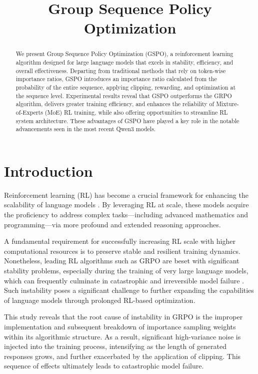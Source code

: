 \title{Group Sequence Policy Optimization}

\begin{abstract}
We present Group Sequence Policy Optimization (GSPO), a reinforcement learning algorithm designed for large language models that excels in stability, efficiency, and overall effectiveness. Departing from traditional methods that rely on token-wise importance ratios, GSPO introduces an importance ratio calculated from the probability of the entire sequence, applying clipping, rewarding, and optimization at the sequence level. Experimental results reveal that GSPO outperforms the GRPO algorithm, delivers greater training efficiency, and enhances the reliability of Mixture-of-Experts (MoE) RL training, while also offering opportunities to streamline RL system architecture. These advantages of GSPO have played a key role in the notable advancements seen in the most recent Qwen3 models.
\end{abstract}

\section{Introduction}
\label{sec:intro}

Reinforcement learning (RL) has become a crucial framework for enhancing the scalability of language models \citep{o1,dpsk-r1,qwq32b,qwen3}. By leveraging RL at scale, these models acquire the proficiency to address complex tasks—including advanced mathematics and programming—via more profound and extended reasoning approaches.

A fundamental requirement for successfully increasing RL scale with higher computational resources is to preserve stable and resilient training dynamics. Nonetheless, leading RL algorithms such as GRPO \citep{grpo} are beset with significant stability problems, especially during the training of very large language models, which can frequently culminate in catastrophic and irreversible model failure \citep{qwen3, minimax-m1}. Such instability poses a significant challenge to further expanding the capabilities of language models through prolonged RL-based optimization.

This study reveals that the root cause of instability in GRPO is the improper implementation and subsequent breakdown of importance sampling weights within its algorithmic structure. As a result, significant high-variance noise is injected into the training process, intensifying as the length of generated responses grows, and further exacerbated by the application of clipping. This sequence of effects ultimately leads to catastrophic model failure.

